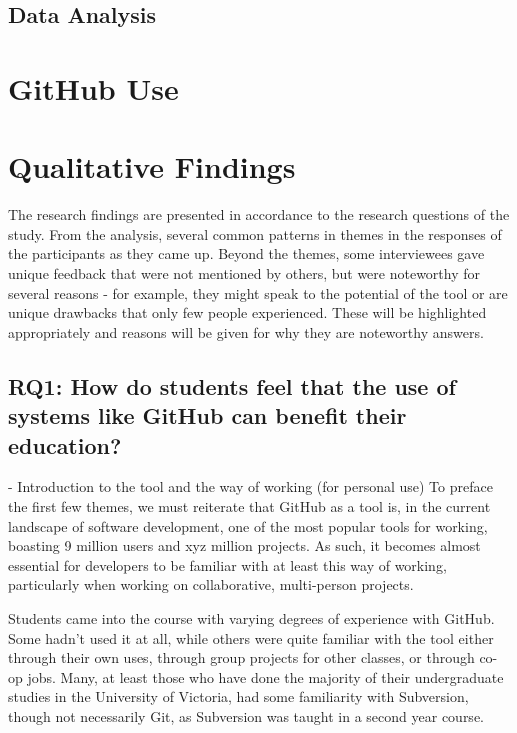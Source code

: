 
\subsection{Data Analysis}

\section{GitHub Use}

\section{Qualitative Findings}

The research findings are presented in accordance to the research questions of the study. From the analysis, several common patterns in themes in the responses of the participants as they came up. Beyond the themes, some interviewees gave unique feedback that were not mentioned by others, but were noteworthy for several reasons - for example, they might speak to the potential of the tool or are unique drawbacks that only few people experienced. These will be highlighted appropriately and reasons will be given for why they are noteworthy answers.


\subsection{RQ1: How do students feel that the use of systems like GitHub can benefit their education?}
- Introduction to the tool and the way of working (for personal use)
To preface the first few themes, we must reiterate that GitHub as a tool is, in the current landscape of software development, one of the most popular tools for working, boasting 9 million users and xyz million projects. As such, it becomes almost essential for developers to be familiar with at least this way of working, particularly when working on collaborative, multi-person projects.

Students came into the course with varying degrees of experience with GitHub. Some hadn't used it at all, while others were quite familiar with the tool either through their own uses, through group projects for other classes, or through co-op jobs. Many, at least those who have done the majority of their undergraduate studies in the University of Victoria, had some familiarity with Subversion, though not necessarily Git, as Subversion was taught in a second year course.

